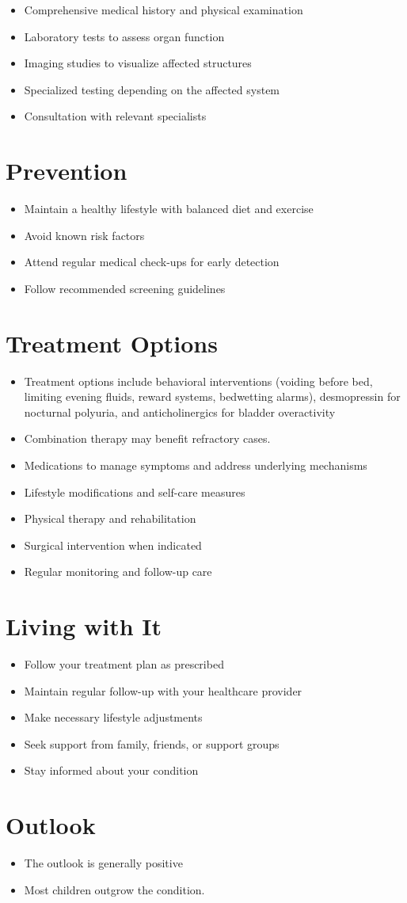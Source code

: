 \begin{itemize}[noitemsep]
  \item Comprehensive medical history and physical examination
  \item Laboratory tests to assess organ function
  \item Imaging studies to visualize affected structures
  \item Specialized testing depending on the affected system
  \item Consultation with relevant specialists
\end{itemize}
\section{Prevention}
\begin{itemize}[noitemsep]
  \item Maintain a healthy lifestyle with balanced diet and exercise
  \item Avoid known risk factors
  \item Attend regular medical check-ups for early detection
  \item Follow recommended screening guidelines
\end{itemize}
\section{Treatment Options}
\begin{itemize}[noitemsep]
  \item Treatment options include behavioral interventions (voiding before bed, limiting evening fluids, reward systems, bedwetting alarms), desmopressin for nocturnal polyuria, and anticholinergics for bladder overactivity
  \item Combination therapy may benefit refractory cases.
  \item Medications to manage symptoms and address underlying mechanisms
  \item Lifestyle modifications and self-care measures
  \item Physical therapy and rehabilitation
  \item Surgical intervention when indicated
  \item Regular monitoring and follow-up care
\end{itemize}
\section{Living with It}
\begin{itemize}[noitemsep]
  \item Follow your treatment plan as prescribed
  \item Maintain regular follow-up with your healthcare provider
  \item Make necessary lifestyle adjustments
  \item Seek support from family, friends, or support groups
  \item Stay informed about your condition
\end{itemize}
\section{Outlook}
\begin{itemize}[noitemsep]
  \item The outlook is generally positive
  \item Most children outgrow the condition.
\end{itemize}
